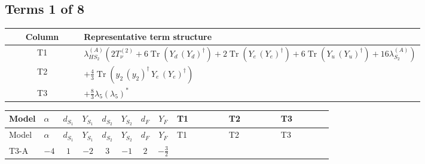 \documentclass[8pt]{article}
\begin{document}
\begin{landscape}
\subsection*{Terms 1 of 8}
\begin{center}
\begin{tabular}{@{}c >{\raggedright\arraybackslash}p{0.82\linewidth}@{}}
\toprule
Column & Representative term structure \\
\midrule
T1 & \(\displaystyle {\lambda_{HS_2}^{(A)}} (2 T_{\nu}^{(2)}+6 \operatorname{Tr}\!\left({Y_d}\,\left({Y_d}\right)^{\dagger}\right)+2 \operatorname{Tr}\!\left({Y_e}\,\left({Y_e}\right)^{\dagger}\right)+6 \operatorname{Tr}\!\left({Y_u}\,\left({Y_u}\right)^{\dagger}\right)+16 {\lambda_{S_2}^{(A)}})\) \\
\midrule
T2 & \(\displaystyle +\frac{4}{3} \operatorname{Tr}\!\left({y_2}\,\left({y_2}\right)^{\dagger}\,{Y_e}\,\left({Y_e}\right)^{\dagger}\right)\) \\
\midrule
T3 & \(\displaystyle +\frac{8}{3} {\lambda_5} \left({\lambda_5}\right)^{*}\) \\
\midrule
\bottomrule
\end{tabular}
\end{center}
\smallskip
\tiny
\begin{longtable}{@{}llcccccc >{\raggedright\arraybackslash}p{0.21\linewidth} >{\raggedright\arraybackslash}p{0.21\linewidth} >{\raggedright\arraybackslash}p{0.21\linewidth}@{}}
\toprule
Model & $\alpha$ & $d_{S_1}$ & $Y_{S_1}$ & $d_{S_2}$ & $Y_{S_2}$ & $d_F$ & $Y_F$ & T1 & T2 & T3 \\
\midrule
\endfirsthead
\toprule
Model & $\alpha$ & $d_{S_1}$ & $Y_{S_1}$ & $d_{S_2}$ & $Y_{S_2}$ & $d_F$ & $Y_F$ & T1 & T2 & T3 \\
\midrule
\endhead
T3-A & $-4$ & $1$ & $-2$ & $3$ & $-1$ & $2$ & $-\frac{3}{2}$ & \scriptsize\adjustbox{max width=\linewidth}{$\begin{gathered} {\lambda_{HS_2}^{(A)}} (2 T_{\nu}^{(2)}+6 \operatorname{Tr}\!\left({Y_d}\,\left({Y_d}\right)^{\dagger}\right)+2 \operatorname{Tr}\!\left({Y_e}\,\left({Y_e}\right)^{\dagger}\right)+6 \operatorname{Tr}\!\left({Y_u}\,\left({Y_u}\right)^{\dagger}\right)+16 {\lambda_{S_2}^{(A)}})\end{gathered}$} & \scriptsize\adjustbox{max width=\linewidth}{$\begin{gathered} +\frac{4}{3} \operatorname{Tr}\!\left({y_2}\,\left({y_2}\right)^{\dagger}\,{Y_e}\,\left({Y_e}\right)^{\dagger}\right)\end{gathered}$} & \scriptsize\adjustbox{max width=\linewidth}{$\begin{gathered} +\frac{8}{3} {\lambda_5} \left({\lambda_5}\right)^{*}\end{gathered}$} \\

\end{longtable}
\end{landscape}
\end{document}
